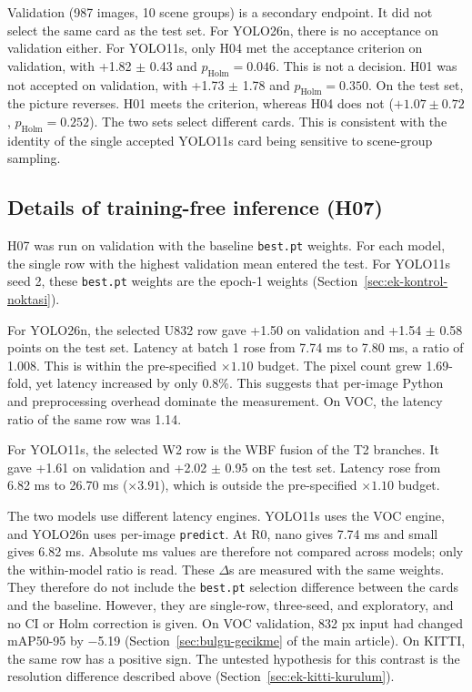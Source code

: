 Validation (987 images, 10 scene groups) is a secondary endpoint. It did not select the same card as the test set. For YOLO26n, there is no acceptance on validation either. For YOLO11s, only H04 met the acceptance criterion on validation, with +1.82 $\pm$ 0.43 and $p_{\mathrm{Holm}}=0.046$. This is not a decision. H01 was not accepted on validation, with +1.73 $\pm$ 1.78 and $p_{\mathrm{Holm}}=0.350$. On the test set, the picture reverses. H01 meets the criterion, whereas H04 does not ($+1.07\pm0.72$, $p_{\mathrm{Holm}}=0.252$). The two sets select different cards. This is consistent with the identity of the single accepted YOLO11s card being sensitive to scene-group sampling.

\subsection{Details of training-free inference (H07)}\label{sec:ek-kitti-h07}
H07 was run on validation with the baseline \texttt{best.pt} weights. For each model, the single row with the highest validation mean entered the test. For YOLO11s seed 2, these \texttt{best.pt} weights are the epoch-1 weights (Section~\ref{sec:ek-kontrol-noktasi}).

For YOLO26n, the selected U832 row gave +1.50 on validation and +1.54 $\pm$ 0.58 points on the test set. Latency at batch 1 rose from 7.74 ms to 7.80 ms, a ratio of 1.008. This is within the pre-specified $\times1.10$ budget. The pixel count grew 1.69-fold, yet latency increased by only 0.8\%. This suggests that per-image Python and preprocessing overhead dominate the measurement. On VOC, the latency ratio of the same row was 1.14.

For YOLO11s, the selected W2 row is the WBF fusion of the T2 branches. It gave +1.61 on validation and +2.02 $\pm$ 0.95 on the test set. Latency rose from 6.82 ms to 26.70 ms ($\times3.91$), which is outside the pre-specified $\times1.10$ budget.

The two models use different latency engines. YOLO11s uses the VOC engine, and YOLO26n uses per-image \texttt{predict}. At R0, nano gives 7.74 ms and small gives 6.82 ms. Absolute ms values are therefore not compared across models; only the within-model ratio is read. These $\Delta$s are measured with the same weights. They therefore do not include the \texttt{best.pt} selection difference between the cards and the baseline. However, they are single-row, three-seed, and exploratory, and no CI or Holm correction is given. On VOC validation, 832 px input had changed mAP50-95 by $-$5.19 (Section~\ref{sec:bulgu-gecikme} of the main article). On KITTI, the same row has a positive sign. The untested hypothesis for this contrast is the resolution difference described above (Section~\ref{sec:ek-kitti-kurulum}).

